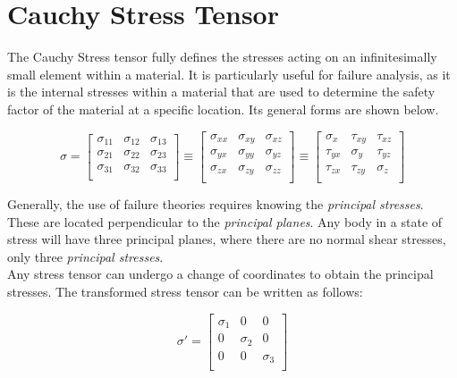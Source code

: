 \documentclass[../main.tex]{subfiles}
\begin{document}
\section{Cauchy Stress Tensor \cite{CAUCHY}} \label{appendix:cauchy}
The Cauchy Stress tensor fully defines the stresses acting on an infinitesimally small element within a material. It is particularly useful for failure analysis, as it is the internal stresses within a material that are used to determine the safety factor of the material at a specific location. Its general forms are shown below.
\begin{center}
	\begin{equation}
	\sigma = \left[{{
			\begin{matrix}
			\sigma _{{11}}&\sigma _{{12}}&\sigma _{{13}}\\
			\sigma _{{21}}&\sigma _{{22}}&\sigma _{{23}}\\
			\sigma _{{31}}&\sigma _{{32}}&\sigma _{{33}}\\
			\end{matrix}}}\right]
	\equiv \left[{{
			\begin{matrix}
			\sigma _{{xx}}&\sigma _{{xy}}&\sigma _{{xz}}\\
			\sigma _{{yx}}&\sigma _{{yy}}&\sigma _{{yz}}\\
			\sigma _{{zx}}&\sigma _{{zy}}&\sigma _{{zz}}\\
			\end{matrix}}}\right]
	\equiv \left[{{
			\begin{matrix}
			\sigma _{{x}}&\tau _{{xy}}&\tau _{{xz}}\\
			\tau _{{yx}}&\sigma _{{y}}&\tau _{{yz}}\\
			\tau _{{zx}}&\tau _{{zy}}&\sigma _{{z}}\\
			\end{matrix}}}\right]
	\end{equation}
\end{center}

Generally, the use of failure theories requires knowing the \textit{principal stresses}. These are located perpendicular to the \textit{principal planes}. Any body in a state of stress will have three principal planes, where there are no normal shear stresses, only three \textit{principal stresses}.\\

Any stress tensor can undergo a change of coordinates to obtain the principal stresses. The transformed stress tensor can be written as follows:
\begin{center}
	\begin{equation}
	\sigma '= \left[{{
			\begin{matrix}
			\sigma _{{1}}&0&0\\
			0&\sigma _{{2}}&0\\
			0&0&\sigma _{{3}}\\
			\end{matrix}}}\right]
	\end{equation}
\end{center}
\end{document}
